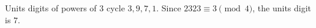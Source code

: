 Units digits of powers of $3$ cycle $3,9,7,1$. Since $2323\equiv3\pmod4$, the units digit is $\boxed{7}$.
